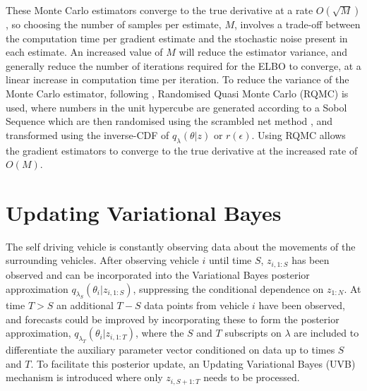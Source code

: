 \documentclass[12pt,a4paper]{article}\usepackage[]{graphicx}\usepackage[]{color}
\begin{document}
These Monte Carlo estimators converge to the true derivative at a rate $O(\sqrt{M})$, so choosing the number of samples per estimate, $M$, involves a trade-off between the computation time per gradient estimate and the stochastic noise present in each estimate. An increased value of $M$ will reduce the estimator variance, and generally reduce the number of iterations required for the ELBO to converge, at a linear increase in computation time per iteration. To reduce the variance of the Monte Carlo estimator, following \citet{Gunawan2017}, Randomised Quasi Monte Carlo (RQMC) is used, where numbers in the unit hypercube are generated according to a Sobol Sequence \citep{Sobol1967} which are then randomised using the scrambled net method \citep{Matousek1998}, and transformed using the inverse-CDF of $q_{\lambda}(\theta | z)$ or $r(\epsilon)$. Using RQMC allows the gradient estimators to converge to the true derivative at the increased rate of $O(M)$.

\section{Updating Variational Bayes}
\label{sec:UVB}

The self driving vehicle is constantly observing data about the movements of the surrounding vehicles. After observing vehicle $i$ until time $S$, $z_{i, 1:S}$ has been observed and can be incorporated into the Variational Bayes posterior approximation $q_{\lambda_S}(\theta_{i} | z_{i, 1:S})$, suppressing the conditional dependence on $z_{1:N}$. At time $T > S$ an additional $T - S$ data points from vehicle $i$ have been observed, and forecasts could be improved by incorporating these to form the posterior approximation, $q_{\lambda_T}(\theta_{i} | z_{i, 1:T})$, where the $S$ and $T$ subscripts on $\lambda$ are included to differentiate the auxiliary parameter vector conditioned on data up to times $S$ and $T$. To facilitate this posterior update, an Updating Variational Bayes (UVB) mechanism is introduced where only $z_{i, S+1:T}$ needs to be processed.
\end{document}
